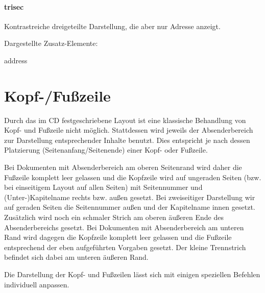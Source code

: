   \begin{minipage}[t]{0.33\textwidth}
    \null\centering\sffamily
  \end{minipage}
  \hfill
  \begin{minipage}[t]{0.6\textwidth}
    \paragraph{trisec}
    \par
    Kontrastreiche dreigeteilte Darstellung, die aber nur Adresse anzeigt.
    \par\bigskip
    \par\bigskip
    Dargestellte Zusatz-Elemente:
    \begin{compactitem}\ttfamily
      \item address
    \end{compactitem}
  \end{minipage}


\section{Kopf-/Fußzeile}\label{sec:headline}

Durch das im \acs{CD} festgeschriebene Layout ist eine klassische Behandlung von
Kopf- und Fußzeile nicht möglich.
Stattdessen wird jeweils der Absenderbereich zur Darstellung entsprechender
Inhalte benutzt. Dies entspricht je nach dessen Platzierung
(Seitenanfang/Seitenende) einer Kopf- oder Fußzeile.

Bei Dokumenten mit Absenderbereich am oberen Seitenrand wird daher die Fußzeile
komplett leer gelassen und die Kopfzeile wird auf ungeraden Seiten
(bzw. bei einseitigem Layout auf allen Seiten)
mit Seitennummer und (Unter-)Kapitelname rechts bzw. außen gesetzt.
Bei zweiseitiger Darstellung wir auf geraden Seiten die Seitennummer außen und
der Kapitelname innen gesetzt.
Zusätzlich wird noch ein schmaler Strich am oberen äußeren Ende des
Absenderbereichs gesetzt.
Bei Dokumenten mit Absenderbereich am unteren Rand wird dagegen die Kopfzeile
komplett leer gelassen und die Fußzeile entsprechend der eben aufgeführten
Vorgaben gesetzt. Der kleine Trennstrich befindet sich dabei am unteren
äußeren Rand.

Die Darstellung der Kopf- und Fußzeilen lässt sich mit einigen
speziellen Befehlen individuell anpassen.

